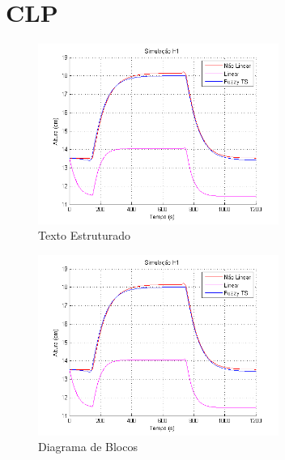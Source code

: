 \section{CLP}

\begin{figure}[H]
	\centering
	\includegraphics[width=0.7\textwidth]{img/FM_h1_5_10_15.png}
	\caption{Texto Estruturado}
	\label{figH1TS2}
\end{figure}

\begin{figure}[H]
	\centering
	\includegraphics[width=0.7\textwidth]{img/FM_h1_5_10_15.png}
	\caption{Diagrama de Blocos}
	\label{figH1TS2}
\end{figure}

%

